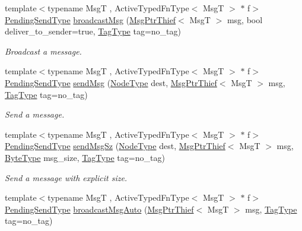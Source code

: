 \begin{DoxyCompactItemize}
{\footnotesize template$<$typename MsgT , Active\+Typed\+Fn\+Type$<$ Msg\+T $>$ $\ast$ f$>$ }\\\hyperlink{structvt_1_1messaging_1_1_active_messenger_a3626a6ca76d8ad4ec7c3b47a2c70d3a8}{Pending\+Send\+Type} \hyperlink{group__typesafehan_ga1a347aac6b6b8d47c9b1c8cc11b7f33e}{broadcast\+Msg} (\hyperlink{structvt_1_1messaging_1_1_msg_ptr_thief}{Msg\+Ptr\+Thief}$<$ MsgT $>$ msg, bool deliver\+\_\+to\+\_\+sender=true, \hyperlink{namespacevt_a84ab281dae04a52a4b243d6bf62d0e52}{Tag\+Type} tag=no\+\_\+tag)
\begin{DoxyCompactList}\small\item\em Broadcast a message. \end{DoxyCompactList}\item 
{\footnotesize template$<$typename MsgT , Active\+Typed\+Fn\+Type$<$ Msg\+T $>$ $\ast$ f$>$ }\\\hyperlink{structvt_1_1messaging_1_1_active_messenger_a3626a6ca76d8ad4ec7c3b47a2c70d3a8}{Pending\+Send\+Type} \hyperlink{group__typesafehan_ga29a784965d1a87bc4abc44f225f40e79}{send\+Msg} (\hyperlink{namespacevt_a866da9d0efc19c0a1ce79e9e492f47e2}{Node\+Type} dest, \hyperlink{structvt_1_1messaging_1_1_msg_ptr_thief}{Msg\+Ptr\+Thief}$<$ MsgT $>$ msg, \hyperlink{namespacevt_a84ab281dae04a52a4b243d6bf62d0e52}{Tag\+Type} tag=no\+\_\+tag)
\begin{DoxyCompactList}\small\item\em Send a message. \end{DoxyCompactList}\item 
{\footnotesize template$<$typename MsgT , Active\+Typed\+Fn\+Type$<$ Msg\+T $>$ $\ast$ f$>$ }\\\hyperlink{structvt_1_1messaging_1_1_active_messenger_a3626a6ca76d8ad4ec7c3b47a2c70d3a8}{Pending\+Send\+Type} \hyperlink{group__typesafehan_gaac9ca3dd1b23d8df47166546341ab046}{send\+Msg\+Sz} (\hyperlink{namespacevt_a866da9d0efc19c0a1ce79e9e492f47e2}{Node\+Type} dest, \hyperlink{structvt_1_1messaging_1_1_msg_ptr_thief}{Msg\+Ptr\+Thief}$<$ MsgT $>$ msg, \hyperlink{namespacevt_aab8d55968084610ce3b17057981e9300}{Byte\+Type} msg\+\_\+size, \hyperlink{namespacevt_a84ab281dae04a52a4b243d6bf62d0e52}{Tag\+Type} tag=no\+\_\+tag)
\begin{DoxyCompactList}\small\item\em Send a message with explicit size. \end{DoxyCompactList}\item 
{\footnotesize template$<$typename MsgT , Active\+Typed\+Fn\+Type$<$ Msg\+T $>$ $\ast$ f$>$ }\\\hyperlink{structvt_1_1messaging_1_1_active_messenger_a3626a6ca76d8ad4ec7c3b47a2c70d3a8}{Pending\+Send\+Type} \hyperlink{group__typesafehan_ga7a5d96676fde771a9ce5af119796fb3a}{broadcast\+Msg\+Auto} (\hyperlink{structvt_1_1messaging_1_1_msg_ptr_thief}{Msg\+Ptr\+Thief}$<$ MsgT $>$ msg, \hyperlink{namespacevt_a84ab281dae04a52a4b243d6bf62d0e52}{Tag\+Type} tag=no\+\_\+tag)

\end{DoxyCompactItemize}

